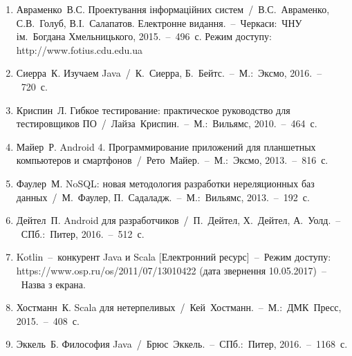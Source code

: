 \documentclass[../main.tex]{subfiles}
\begin{document}
\begin{enumerate}
	\item Авраменко~В.С. Проектування інформаційних систем~/~В.С.~Авраменко, С.В.~Голуб, В.І.~Салапатов. Електронне видання.~–~Черкаси:~ЧНУ ім.~Богдана Хмельницького, 2015.~–~496~с. Режим доступу: http://www.fotius.cdu.edu.ua
	\item Сиерра~К. Изучаем Java~/~К.~Сиерра, Б.~Бейтс.~–~М.:~Эксмо, 2016.~–~720~с.
	\item Криспин~Л. Гибкое тестирование: практическое руководство для тестировщиков ПО~/~Лайза~Криспин.~–~М.:~Вильямс, 2010.~–~464~с.
	\item Майер~Р. Android 4. Программирование приложений для планшетных компьютеров и смартфонов~/~Рето~Майер.~–~М.:~Эксмо, 2013.~–~816~с.
	\item Фаулер~М. NoSQL: новая методология разработки нереляционных баз данных~/~М.~Фаулер, П.~Садаладж.~–~М.:~Вильямс, 2013.~–~192~с.
	\item Дейтел~П. Android для разработчиков~/~П.~Дейтел, Х.~Дейтел, А.~Уолд.~–~СПб.:~Питер, 2016.~–~512~с.
	\item Kotlin~–~конкурент Java и Scala [Електронний ресурс]~–~Режим доступу: https://www.osp.ru/os/2011/07/13010422 (дата звернення 10.05.2017)~–~Назва з екрана.
	\item Хостманн~К. Scala для нетерпеливых~/~Кей~Хостманн.~–~М.:~ДМК~Пресс, 2015.~–~408~с.
	\item Эккель~Б. Философия Java~/~Брюс~Эккель.~–~СПб.:~Питер, 2016.~–~1168~с.
\end{enumerate}
	
\end{document}
